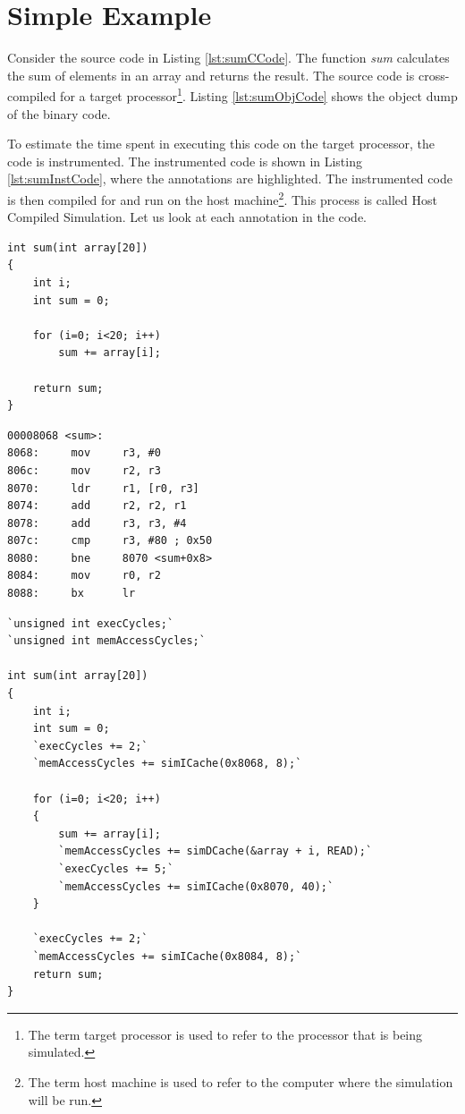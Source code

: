 \section{Simple Example}
\label{sec:SimpleExample}
Consider the source code in Listing \ref{lst:sumCCode}. The function \emph{sum} calculates the sum of elements in an array and returns the result. The source code is cross-compiled for a target processor\footnote{The term target processor is used to refer to the processor that is being simulated.}. Listing \ref{lst:sumObjCode} shows the object dump of the binary code. 

To estimate the time spent in executing this code on the target processor, the code is instrumented. The instrumented code is shown in Listing \ref{lst:sumInstCode}, where the annotations are highlighted. The instrumented code is then compiled for and run on the host machine\footnote{The term host machine is used to refer to the computer where the simulation will be run.}. This process is called Host Compiled Simulation. Let us look at each annotation in the code.

\vspace*{10pt}
\begin{minipage}{0.5\textwidth}
\begin{lstlisting}[caption={Simple C Code},label={lst:sumCCode}]
int sum(int array[20])
{
	int i;
	int sum = 0;
	
	for (i=0; i<20; i++)
		sum += array[i];
	
	return sum;
}
\end{lstlisting}
\end{minipage}%
\begin{minipage}{0.5\textwidth}
\begin{lstlisting}[caption={Objdump Code},label={lst:sumObjCode}]
00008068 <sum>:
8068:     mov     r3, #0
806c:     mov     r2, r3
8070:     ldr     r1, [r0, r3]
8074:     add     r2, r2, r1
8078:     add     r3, r3, #4
807c:     cmp     r3, #80 ; 0x50
8080:     bne     8070 <sum+0x8>
8084:     mov     r0, r2
8088:     bx      lr
\end{lstlisting}
\end{minipage}
\vspace*{5pt}
\begin{lstlisting}[caption={Instrumented Code},label={lst:sumInstCode}]
`unsigned int execCycles;`
`unsigned int memAccessCycles;`

int sum(int array[20])
{
	int i;
	int sum = 0;
	`execCycles += 2;`
	`memAccessCycles += simICache(0x8068, 8);`
	
	for (i=0; i<20; i++)
	{
		sum += array[i];
		`memAccessCycles += simDCache(&array + i, READ);`
		`execCycles += 5;`
		`memAccessCycles += simICache(0x8070, 40);`
	}
	
	`execCycles += 2;`
	`memAccessCycles += simICache(0x8084, 8);`
	return sum;
}
\end{lstlisting}

